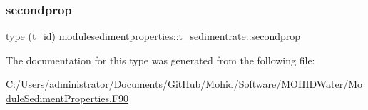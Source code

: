 \subsubsection{\texorpdfstring{secondprop}{secondprop}}
{\footnotesize\ttfamily type (\mbox{\hyperlink{structmodulesedimentproperties_1_1t__id}{t\+\_\+id}}) modulesedimentproperties\+::t\+\_\+sedimentrate\+::secondprop\hspace{0.3cm}{\ttfamily [private]}}



The documentation for this type was generated from the following file\+:\begin{DoxyCompactItemize}
\item 
C\+:/\+Users/administrator/\+Documents/\+Git\+Hub/\+Mohid/\+Software/\+M\+O\+H\+I\+D\+Water/\mbox{\hyperlink{_module_sediment_properties_8_f90}{Module\+Sediment\+Properties.\+F90}}\end{DoxyCompactItemize}

